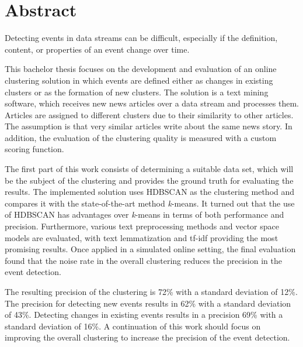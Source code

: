 \section*{Abstract}
\label{sec:abstract}

Detecting events in data streams can be difficult,
especially if the definition, content, or properties of an event change over time.

This bachelor thesis focuses on the development and evaluation of an online clustering solution
in which events are defined either as changes in existing clusters or as the formation of new clusters.
The solution is a text mining software, which receives new news articles over a data stream and processes them.
Articles are assigned to different clusters due to their similarity to other articles.
The assumption is that very similar articles write about the same news story.
In addition, the evaluation of the clustering quality is measured with a custom scoring function.

The first part of this work consists of determining a suitable data set,
which will be the subject of the clustering and provides the ground truth for evaluating the results.
The implemented solution uses HDBSCAN as the clustering method
and compares it with the state-of-the-art method \textit{k}-means.
It turned out that the use of HDBSCAN has advantages over \textit{k}-means in terms of both performance and precision.
Furthermore, various text preprocessing methods and vector space models are evaluated,
with text lemmatization and tf-idf providing the most promising results.
Once applied in a simulated online setting,
the final evaluation found that the noise rate in the overall clustering reduces the precision in the event detection.

The resulting precision of the clustering is 72\% with a standard deviation of 12\%.
The precision for detecting new events results in 62\% with a standard deviation of 43\%.
Detecting changes in existing events results in a precision 69\% with a standard deviation of 16\%.
A continuation of this work should focus on improving the overall clustering to increase the precision of the event detection.
